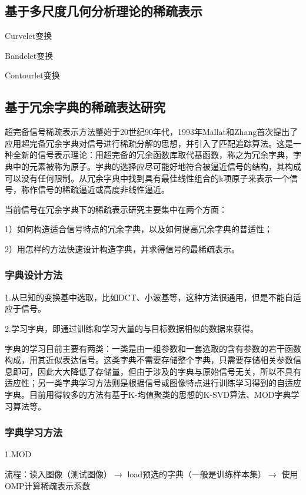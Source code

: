 \documentclass[a4paper,12pt]{article}
\begin{document}
\subsection{基于多尺度几何分析理论的稀疏表示}

Curvelet变换

Bandelet变换

Contourlet变换

\subsection{基于冗余字典的稀疏表达研究}

超完备信号稀疏表示方法肇始于20世纪90年代，1993年Mallat和Zhang首次提出了应用超完备冗余字典对信号进行稀疏分解的思想，并引入了匹配追踪算法。这是一种全新的信号表示理论：用超完备的冗余函数库取代基函数，称之为冗余字典，字典中的元素被称为原子。字典的选择应尽可能好地符合被逼近信号的结构，其构成可以没有任何限制。从冗余字典中找到具有最佳线性组合的k项原子来表示一个信号，称作信号的稀疏逼近或高度非线性逼近。

当前信号在冗余字典下的稀疏表示研究主要集中在两个方面：

1）如何构造适合信号特点的冗余字典，以及如何提高冗余字典的普适性；

2）用怎样的方法快速设计构造字典，并求得信号的最稀疏表示。

\subsubsection{字典设计方法}

1.从已知的变换基中选取，比如DCT、小波基等，这种方法很通用，但是不能自适应于信号。

2.学习字典，即通过训练和学习大量的与目标数据相似的数据来获得。

字典的学习目前主要有两类：一类是由一组参数和一套选取的含有参数的若干函数构成，用其近似表达信号。这类字典不需要存储整个字典，只需要存储相关参数信息即可，因此大大降低了存储量，但由于涉及的字典与原始信号无关，所以不具有适应性；另一类字典学习方法则是根据信号或图像特点进行训练学习得到的自适应字典。目前用得较多的方法有基于K-均值聚类的思想的K-SVD算法、MOD字典学习算法等。

\subsubsection{字典学习方法}

1.MOD

流程：读入图像（测试图像）$\to$ load预选的字典（一般是训练样本集）$\to$ 使用OMP计算稀疏表示系数
\end{document}
